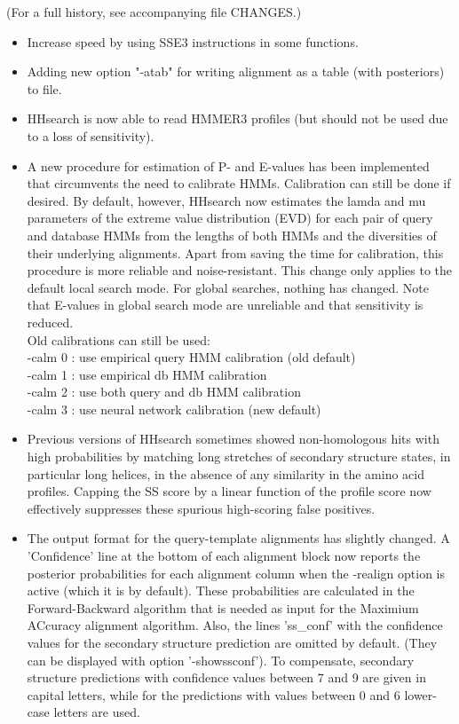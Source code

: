 \documentclass[11pt,a4paper]{article}
\begin{document}
(For a full history, see accompanying file CHANGES.)

\begin{itemize}


\item{Increase speed by using SSE3 instructions in some functions.
}

\item{Adding new option "-atab" for writing alignment as a table (with posteriors) to file.
}

\item{HHsearch is now able to read HMMER3 profiles (but should not be used due to a loss of sensitivity).
}

\item{A new procedure for estimation of P- and E-values has been implemented that
  circumvents the need to calibrate HMMs. Calibration can still be done if 
  desired. By default, however, HHsearch now estimates the lamda and mu 
  parameters of the extreme value distribution (EVD) for each pair of query 
  and database HMMs from the lengths of both HMMs and the diversities of their 
  underlying alignments. Apart from saving the time for calibration, this 
  procedure is more reliable and noise-resistant. This change only applies to 
  the default local search mode. For global searches, nothing has changed. Note
  that E-values in global search mode are unreliable and that sensitivity is 
  reduced. \\
  Old calibrations can still be used:\\
   -calm 0 : use empirical query HMM calibration (old default)\\
   -calm 1 : use empirical db HMM calibration\\
   -calm 2 : use both query and db HMM calibration\\
   -calm 3 : use neural network calibration (new default)
}

\item{Previous versions of HHsearch sometimes showed non-homologous hits with high 
  probabilities by matching long stretches of secondary structure states, 
  in particular long helices, in the absence of any similarity in the amino 
  acid profiles. Capping the SS score by a linear function of the profile score
  now effectively suppresses these spurious high-scoring false positives. 
}

\item{The output format for the query-template alignments has slightly changed.
  A 'Confidence' line at the bottom of each alignment block now reports the 
  posterior probabilities for each alignment column when the -realign option
  is active (which it is by default). These probabilities are calculated in the 
  Forward-Backward algorithm that is needed as input for the Maximium ACcuracy 
  alignment algorithm. Also, the lines 'ss\_conf' with the confidence values 
  for the secondary structure prediction are omitted by default. (They can  
  be displayed with option '-showssconf'). To compensate, secondary structure 
  predictions with confidence values between 7 and 9 are given in capital 
  letters, while for the predictions with values between 0 and 6 lower-case 
  letters are used. 
}


\end{itemize}
\end{document}
